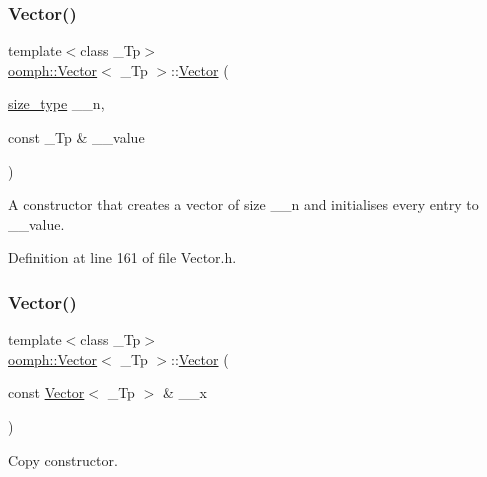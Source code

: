 \subsubsection{\texorpdfstring{Vector()}{Vector()}\hspace{0.1cm}{\footnotesize\ttfamily [3/4]}}
{\footnotesize\ttfamily template$<$class \+\_\+\+Tp$>$ \\
\hyperlink{classoomph_1_1Vector}{oomph\+::\+Vector}$<$ \+\_\+\+Tp $>$\+::\hyperlink{classoomph_1_1Vector}{Vector} (\begin{DoxyParamCaption}\item[{\hyperlink{classoomph_1_1Vector_a8ad2a43bd51f6bf2a981dd4e4e4247f5}{size\+\_\+type}}]{\+\_\+\+\_\+n,  }\item[{const \+\_\+\+Tp \&}]{\+\_\+\+\_\+value }\end{DoxyParamCaption})\hspace{0.3cm}{\ttfamily [inline]}}



A constructor that creates a vector of size \+\_\+\+\_\+n and initialises every entry to \+\_\+\+\_\+value. 



Definition at line 161 of file Vector.\+h.

\mbox{\label{classoomph_1_1Vector_a6b3ef7c59dd463636129183dd64f7843}} 
\subsubsection{\texorpdfstring{Vector()}{Vector()}\hspace{0.1cm}{\footnotesize\ttfamily [4/4]}}
{\footnotesize\ttfamily template$<$class \+\_\+\+Tp$>$ \\
\hyperlink{classoomph_1_1Vector}{oomph\+::\+Vector}$<$ \+\_\+\+Tp $>$\+::\hyperlink{classoomph_1_1Vector}{Vector} (\begin{DoxyParamCaption}\item[{const \hyperlink{classoomph_1_1Vector}{Vector}$<$ \+\_\+\+Tp $>$ \&}]{\+\_\+\+\_\+x }\end{DoxyParamCaption})\hspace{0.3cm}{\ttfamily [inline]}}



Copy constructor. 



